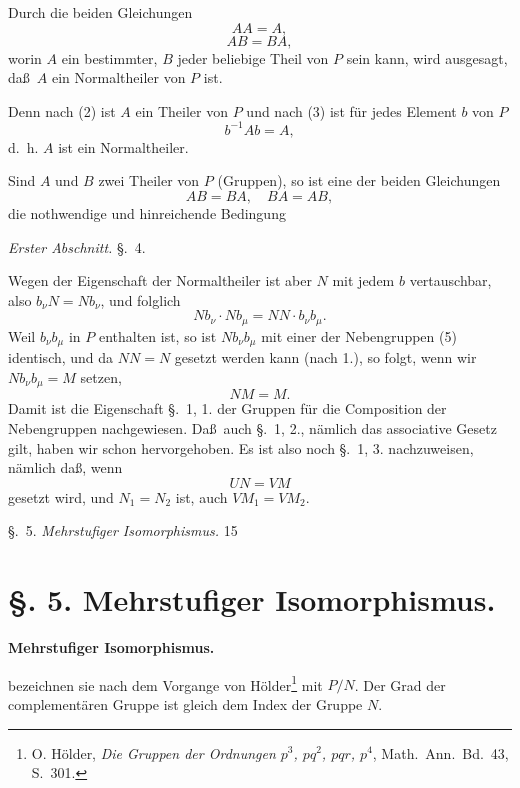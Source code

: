 \documentclass[12pt,a4paper]{book}
\begin{document}
\vspace{0.3cm}

Durch die beiden Gleichungen
\[AA = A,\]
\[AB = BA,\]
worin $A$ ein bestimmter, $B$ jeder beliebige Theil von $P$ sein kann, wird ausgesagt, da\ss\ $A$ ein Normaltheiler von $P$ ist.

Denn nach (2) ist $A$ ein Theiler von $P$ und nach (3) ist f\"ur jedes Element $b$ von $P$
\[b^{-1}Ab = A,\]
d.~h. $A$ ist ein Normaltheiler.

Sind $A$ und $B$ zwei Theiler von $P$ (Gruppen), so ist eine der beiden Gleichungen
\[AB = BA,\quad BA = AB,\]
die nothwendige und hinreichende Bedingung

\newpage
{} \hfill \textit{Erster Abschnitt.} \hfill \S.~4.

\vspace{0.3cm}

Wegen der Eigenschaft der Normaltheiler ist aber $N$ mit jedem $b$ vertauschbar, also $b_\nu N = Nb_\nu$, und folglich
\[N b_\nu \cdot N b_\mu = NN \cdot b_\nu b_\mu.\]
Weil $b_\nu b_\mu$ in $P$ enthalten ist, so ist $Nb_\nu b_\mu$ mit einer der Nebengruppen (5) identisch, und da $NN = N$ gesetzt werden kann (nach 1.), so folgt, wenn wir $Nb_\nu b_\mu = M$ setzen,
\[NM = M.\]
Damit ist die Eigenschaft \S.~1, 1. der Gruppen f\"ur die Composition der Nebengruppen nachgewiesen. Da\ss\ auch \S.~1, 2., n\"amlich das associative Gesetz gilt, haben wir schon hervorgehoben. Es ist also noch \S.~1, 3. nachzuweisen, n\"amlich da\ss, wenn
\[UN = VM\]
gesetzt wird, und $N_1 = N_2$ ist, auch $VM_1 = VM_2$.

\newpage
\noindent\S.~5. \hfill \textit{Mehrstufiger Isomorphismus.} \hfill 15

\vspace{0.3cm}

\section*{\S. 5. Mehrstufiger Isomorphismus.}

\begin{center}
\textbf{Mehrstufiger Isomorphismus.}
\end{center}

bezeichnen sie nach dem Vorgange von H\"older\footnote{O. H\"older, \textit{Die Gruppen der Ordnungen $p^3$, $pq^2$, $pqr$, $p^4$}, Math.\ Ann.\ Bd.~43, S.~301.} mit $P/N$. Der Grad der complement\"aren Gruppe ist gleich dem Index der Gruppe $N$.
\end{document}
